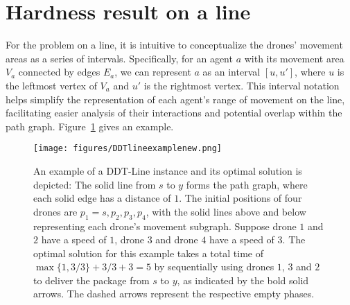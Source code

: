 \section{Hardness result on a line}
\label{npline}



For the problem on a line, it is intuitive to conceptualize the drones' movement areas as a series of intervals. Specifically, for an agent $a$ with its movement area $V_a$ connected by edges $E_a$, we can represent $a$ as an interval $[u,u']$, where $u$ is the leftmost vertex of $V_a$  and $u'$ is the rightmost vertex. This interval notation helps simplify the representation of each agent’s range of movement on the line, facilitating easier analysis of their interactions and potential overlap within the path graph.  Figure~\ref{fig:DDTlineexample} gives an example.
    \begin{figure}
        \centering
        \texttt{[image: figures/DDTlineexamplenew.png]}
        \caption{An example of a DDT-Line instance and its optimal solution is depicted: The solid line from $s$ to $y$ forms the path graph, where each solid edge has a distance of $1$. The initial positions of four drones are $p_1=s, p_2, p_3, p_4$, with the solid lines above and below representing each drone's movement subgraph. Suppose drone $1$ and $2$ have a speed of $1$, drone $3$ and drone $4$ have a speed of $3$. The optimal solution for this example takes a total time of $ \max\{1, 3/3\} + 3/3 + 3 = 5$ by sequentially using drones $1 $,  $ 3$ and $ 2$ to deliver the package from  $s$ to $y$, as indicated by the bold solid arrows. The dashed arrows represent the respective empty phases.} 
        \label{fig:DDTlineexample}
    \end{figure}
 

